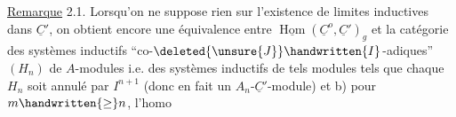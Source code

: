 \uline{Remarque} 2.1. Lorsqu'on ne suppose rien sur l'existence de limites
inductives dans $\underline C'$, on obtient encore une équivalence entre $\underline{\operatorname{Hom}}(\underline C^o,\underline C')_g$
et la catégorie des systèmes inductifs ``co-$\deleted{\unsure{J}}\handwritten{I}$-adiques'' $(H_n)$ de $A$-modules
i.e. des systèmes inductifs de tels modules tels que  chaque $H_n$ soit
annulé par $I^{n+1}$ (donc en fait un $A_n$-$\underline C'$-module) et b) pour $m\handwritten{\geq}n$, l'homo%

